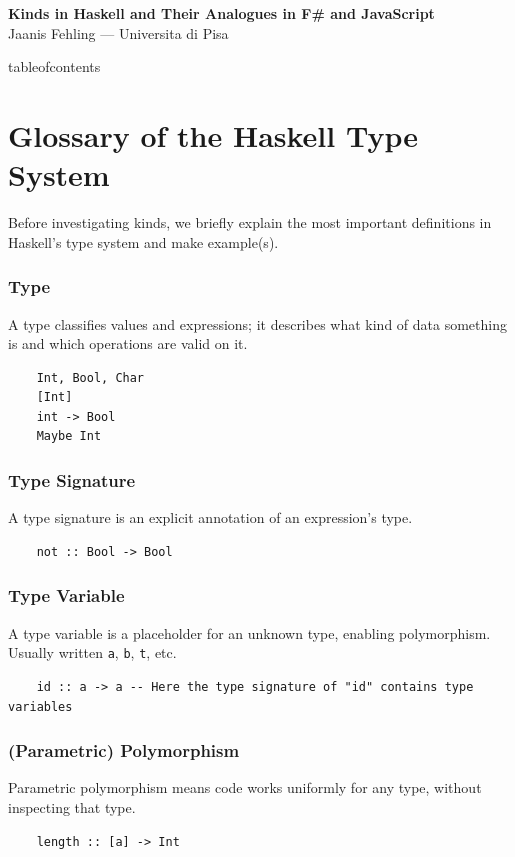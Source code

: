 \documentclass[12pt,oneside,a4paper]{article}
\begin{document}
\begin{center}
{\LARGE\bfseries Kinds in Haskell and Their Analogues in F\# and JavaScript}\\[1ex]
{\small Jaanis Fehling \quad --- \quad Universita di Pisa}\\[2ex]
\end{center}

\vspace{96pt}

\csname tableofcontents\endcsname
\clearpage


\section{Glossary of the Haskell Type System}
Before investigating kinds, we briefly explain the most important definitions in Haskell's type system and make example(s).
\subsubsection*{Type}
A type classifies values and expressions; it describes what kind of data something is and which operations are valid on it.
\begin{lstlisting}
    Int, Bool, Char
    [Int]
    int -> Bool
    Maybe Int
\end{lstlisting}
\subsubsection*{Type Signature}
A type signature is an explicit annotation of an expression’s type.
\begin{lstlisting}
    not :: Bool -> Bool
\end{lstlisting}
\subsubsection*{Type Variable}
A type variable is a placeholder for an unknown type, enabling polymorphism. Usually written \texttt{a}, \texttt{b}, \texttt{t}, etc.
\begin{lstlisting}
    id :: a -> a -- Here the type signature of "id" contains type variables
\end{lstlisting}
\subsubsection*{(Parametric) Polymorphism}
Parametric polymorphism means code works uniformly for any type, without inspecting that type.
\begin{lstlisting}
    length :: [a] -> Int
\end{lstlisting}
\end{document}
